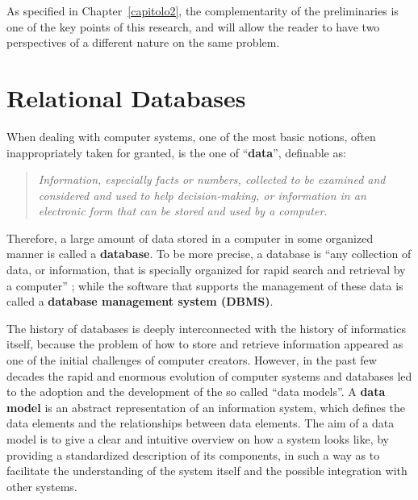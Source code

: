 As specified in Chapter~\ref{capitolo2}, the complementarity of the preliminaries is one of the key points of this research, and will allow the reader to have two perspectives of a different nature on the same problem.


\section{Relational Databases}
\label{section:relational_databases}
When dealing with computer systems, one of the most basic notions, often inappropriately taken for granted, is the one of ``\textbf{data}'', definable as:
\begin{quote}\emph{Information, especially facts or numbers, collected to be examined and considered and used to help decision-making, or information in an electronic form that can be stored and used by a computer.} \cite{cambridge2013data}\end{quote}
Therefore, a large amount of data stored in a computer in some organized manner is called a \textbf{database}. To be more precise, a database is ``any collection of data, or information, that is specially organized for rapid search and retrieval by a computer'' \cite{britannica2020database}; while the software that supports the management of these data is called a \textbf{database management system (DBMS)}.

The history of databases is deeply interconnected with the history of informatics itself, because the problem of how to store and retrieve information appeared as one of the initial challenges of computer creators. However, in the past few decades the rapid and enormous evolution of computer systems and databases led to the adoption and the development of the so called ``data models''. A \textbf{data model} \cite{abiteboul1995foundations} is an abstract representation of an information system, which defines the data elements and the relationships between data elements. The aim of a data model is to give a clear and intuitive overview on how a system looks like, by providing a standardized description of its components, in such a way as to facilitate the understanding of the system itself and the possible integration with other systems.

